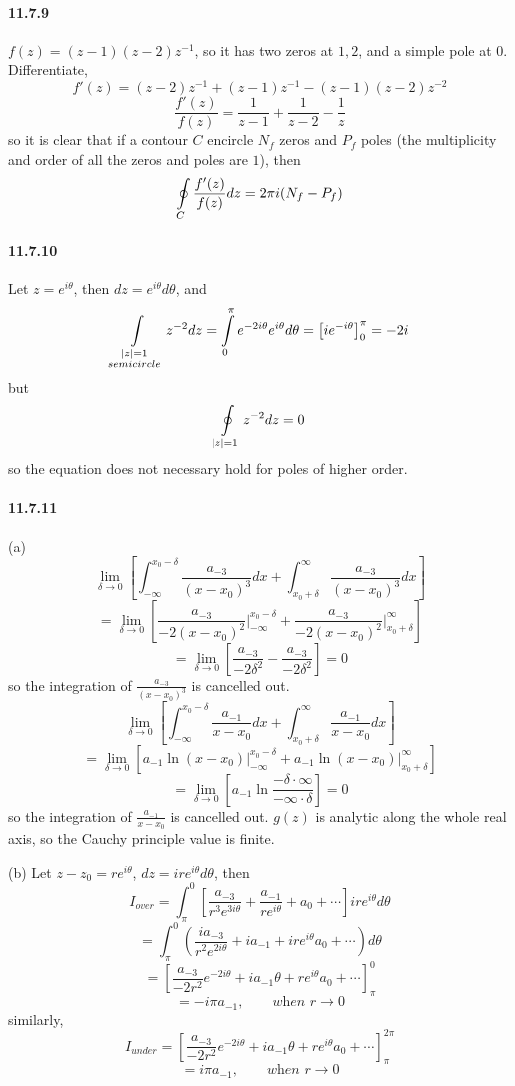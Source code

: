 \documentclass[a4paper]{article}
\begin{document}
\paragraph{11.7.9}
$f(z)=(z-1)(z-2)z^{-1}$, so it has two zeros at $1,2$, and a simple pole at $0$. Differentiate, 
\[
f'(z)=(z-2)z^{-1}+(z-1)z^{-1}-(z-1)(z-2)z^{-2}
\]
\[
\frac{f'(z)}{f(z)}=\frac{1}{z-1}+\frac{1}{z-2}-\frac{1}{z}
\]
so it is clear that if a contour $C$ encircle $N_f$ zeros and $P_f$ poles (the multiplicity and order of all the zeros and poles are $1$), then
\[
\oint\displaylimits_C\frac{f'(z)}{f(z)}dz=2\pi i(N_f-P_f)
\]

\paragraph{11.7.10}
Let $z=e^{i\theta}$, then $dz=e^{i\theta}d\theta$, and
\[
\int\displaylimits_{\substack{|z|=1\\semicircle}}z^{-2}dz=\int\displaylimits_0^\pi e^{-2i\theta}e^{i\theta}d\theta=\left[ie^{-i\theta} \right]_0^\pi=-2i
\]
but
\[
\oint\displaylimits_{|z|=1}z^{-2}dz=0
\]
so the equation does not necessary hold for poles of higher order.

\paragraph{11.7.11}
(a)
\[
\lim_{\delta\to0}\left[\int_{-\infty}^{x_0-\delta}\frac{a_{-3}}{(x-x_0)^3}dx+\int_{x_0+\delta}^\infty\frac{a_{-3}}{(x-x_0)^3}dx \right]
\]
\[
=\lim_{\delta\to0}\left[\frac{a_{-3}}{-2(x-x_0)^2}\Big|_{-\infty}^{x_0-\delta}+\frac{a_{-3}}{-2(x-x_0)^2}\Big|_{x_0+\delta}^\infty \right]
\]
\[
=\lim_{\delta\to0}\left[\frac{a_{-3}}{-2\delta^2}-\frac{a_{-3}}{-2\delta^2}\right]=0
\]
so the integration of $\frac{a_{-3}}{(x-x_0)^3}$ is cancelled out.
\[
\lim_{\delta\to0}\left[\int_{-\infty}^{x_0-\delta}\frac{a_{-1}}{x-x_0}dx+\int_{x_0+\delta}^\infty\frac{a_{-1}}{x-x_0}dx \right]
\]
\[
=\lim_{\delta\to0}\left[a_{-1}\ln(x-x_0)\Big|_{-\infty}^{x_0-\delta}+a_{-1}\ln(x-x_0)\Big|_{x_0+\delta}^\infty \right]
\]
\[
=\lim_{\delta\to0}\left[a_{-1}\ln\frac{-\delta\cdot\infty}{-\infty\cdot\delta} \right]=0
\]
so the integration of $\frac{a_{-1}}{x-x_0}$ is cancelled out. $g(z)$ is analytic along the whole real axis, so the Cauchy principle value is finite.
\medskip

(b)
Let $z-z_0=re^{i\theta}$, $dz=ire^{i\theta}d\theta$, then
\[
I_{over}=\int_\pi^0\left[\frac{a_{-3}}{r^3e^{3i\theta}}+\frac{a_{-1}}{re^{i\theta}}+a_0+\cdots \right]ire^{i\theta}d\theta
\]
\[
=\int_\pi^0\left(\frac{ia_{-3}}{r^2e^{2i\theta}}+ia_{-1}+ire^{i\theta}a_0+\cdots \right)d\theta
\]
\[
=\left[\frac{a_{-3}}{-2r^2}e^{-2i\theta}+ia_{-1}\theta+re^{i\theta}a_0+\cdots \right]_\pi^0
\]
\[
=-i\pi a_{-1},\qquad\textit{when $r\to0$}
\]
similarly,
\[
I_{under}=\left[\frac{a_{-3}}{-2r^2}e^{-2i\theta}+ia_{-1}\theta+re^{i\theta}a_0+\cdots \right]_\pi^{2\pi}
\]
\[
=i\pi a_{-1},\qquad\textit{when $r\to0$}
\]
\end{document}
